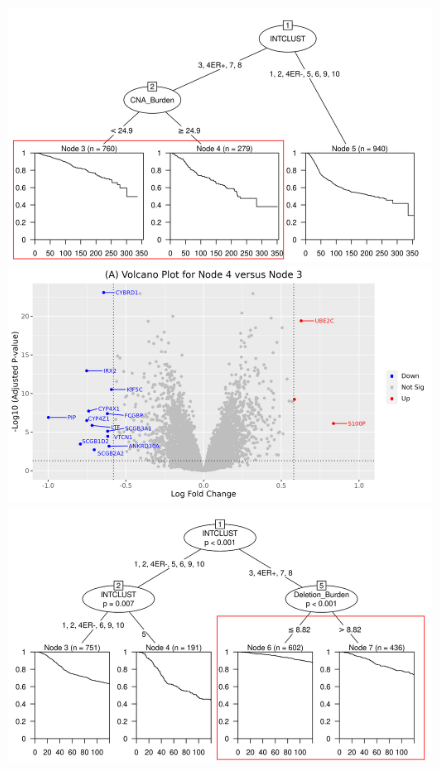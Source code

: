 \begin{figure}[!ht]
\begin{center}
\begin{multicols}{2}
    \includegraphics[width=1\linewidth]{../figures/Chapter_4/Partykit_Survival_Burden_DSS_INTCLUST_Ann.png}\par 
    \includegraphics[width=1\linewidth]{../figures/Chapter_4/Volcano_3.png}\par 
\end{multicols}
\begin{multicols}{2}    
	\includegraphics[width=1\linewidth]{../figures/Chapter_4/Ctree_Survival_Burden_TenYearDSS_INTCLUST_Ann.png}\par

\end{multicols}
\end{center}
\end{figure}

